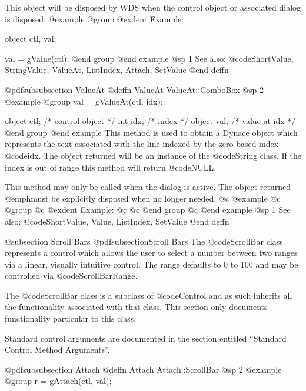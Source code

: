 This object will be disposed by WDS when the control object or
associated dialog is disposed.
@example
@group
@exdent Example:

object  ctl, val;

val = gValue(ctl);
@end group
@end example
@sp 1
See also:  @code{ShortValue, StringValue, ValueAt, ListIndex, Attach, SetValue}
@end deffn






@pdfsubsubsection {ValueAt}
@deffn {ValueAt} ValueAt::ComboBox
@sp 2
@example
@group
val = gValueAt(ctl, idx);

object  ctl;   /*  control object  */
int     idx;   /*  index           */
object  val;   /*  value at idx    */
@end group
@end example
This method is used to obtain a Dynace object which represents the text
associated with the line indexed by the zero based index @code{idx}.
The object returned will be an instance of the @code{String} class.  If
the index is out of range this method will return @code{NULL}.

This method may only be called when the dialog is active.  The object
returned @emph{must} be explicitly disposed when no longer needed.
@c @example
@c @group
@c @exdent Example:
@c 
@c @end group
@c @end example
@sp 1
See also:  @code{ShortValue, Value, ListIndex, SetValue}
@end deffn









@subsection Scroll Bars
@pdfsubsection{Scroll Bars}
The @code{ScrollBar} class represents a control which allows the user to
select a number between two ranges via a linear, visually intuitive
control.  The range defaults to 0 to 100 and may be controlled via
@code{ScrollBarRange}.

The @code{ScrollBar} class is a subclass of @code{Control} and as such
inherits all the functionality associated with that class.  This section
only documents functionality particular to this class.

Standard control arguments are documented in the section entitled
``Standard Control Method Arguments''.










@pdfsubsubsection {Attach}
@deffn {Attach} Attach::ScrollBar
@sp 2
@example
@group
r = gAttach(ctl, val);

